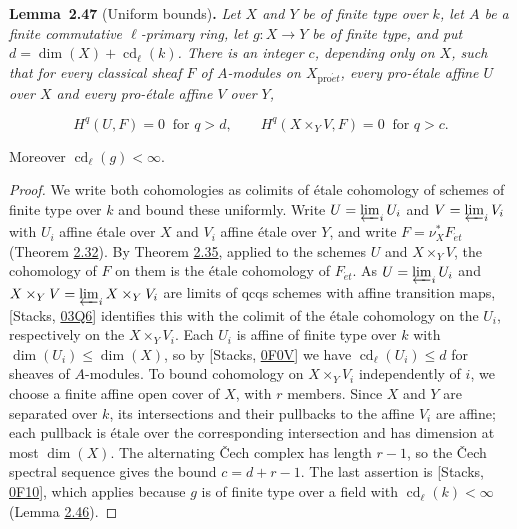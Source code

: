 \documentclass[11pt]{article}
\newenvironment{bpstatement}[2]{\par\addvspace{0.6\baselineskip}\noindent\textbf{#1}#2\textbf{.}\enspace\ignorespaces}
  {\par\addvspace{0.4\baselineskip}}
\newenvironment{bpstatementit}[2]{\begin{bpstatement}{#1}{#2}\itshape\ignorespaces}{\end{bpstatement}}
\begin{document}
\label{bp140}%
\begin{bpstatementit}{Lemma~2.47}{ (Uniform bounds)}
Let \(X\) and \(Y\) be of finite type over \(k\), let \(A\) be a finite commutative \(\ell\)-primary ring, let \(g:X\to Y\) be of finite type, and put \(d=\dim(X)+\operatorname{cd}_\ell(k)\). There is an integer \(c\), depending only on \(X\), such that for every classical sheaf \(F\) of \(A\)-modules on \(X_{\mathrm{pro}\acute{e}t}\), every pro-étale affine \(U\) over \(X\) and every pro-étale affine \(V\) over \(Y\),

\[
H^q(U,F)=0\ \text{ for }q>d,
\qquad
H^q(X\times_YV,F)=0\ \text{ for }q>c.
\]

Moreover \(\operatorname{cd}_\ell(g)<\infty\).
\end{bpstatementit}

\begin{proof}[{Proof}]\label{bp141}%
We write both cohomologies as colimits of étale cohomology of schemes of finite type over \(k\) and bound these uniformly. Write \(U=\varprojlim_iU_i\) and \(V=\varprojlim_iV_i\) with \(U_i\) affine étale over \(X\) and \(V_i\) affine étale over \(Y\), and write \(F=\nu_X^*F_{\acute{e}t}\) (Theorem \hyperref[bp93]{2.32}). By Theorem \hyperref[bp101]{2.35}, applied to the schemes \(U\) and \(X\times_YV\), the cohomology of \(F\) on them is the étale cohomology of \(F_{\acute{e}t}\). As \(U=\varprojlim_iU_i\) and \(X\times_YV=\varprojlim_iX\times_YV_i\) are limits of qcqs schemes with affine transition maps, [Stacks, \href{https://stacks.math.columbia.edu/tag/03Q6}{03Q6}] identifies this with the colimit of the étale cohomology on the \(U_i\), respectively on the \(X\times_YV_i\). Each \(U_i\) is affine of finite type over \(k\) with \(\dim(U_i)\leq\dim(X)\), so by [Stacks, \href{https://stacks.math.columbia.edu/tag/0F0V}{0F0V}] we have \(\operatorname{cd}_\ell(U_i)\leq d\) for sheaves of \(A\)-modules. To bound cohomology on \(X\times_YV_i\) independently of \(i\), we choose a finite affine open cover of \(X\), with \(r\) members. Since \(X\) and \(Y\) are separated over \(k\), its intersections and their pullbacks to the affine \(V_i\) are affine; each pullback is étale over the corresponding intersection and has dimension at most \(\dim(X)\). The alternating Čech complex has length \(r-1\), so the Čech spectral sequence gives the bound \(c=d+r-1\). The last assertion is [Stacks, \href{https://stacks.math.columbia.edu/tag/0F10}{0F10}], which applies because \(g\) is of finite type over a field with \(\operatorname{cd}_\ell(k)<\infty\) (Lemma \hyperref[bp137]{2.46}).
\end{proof}
\end{document}
